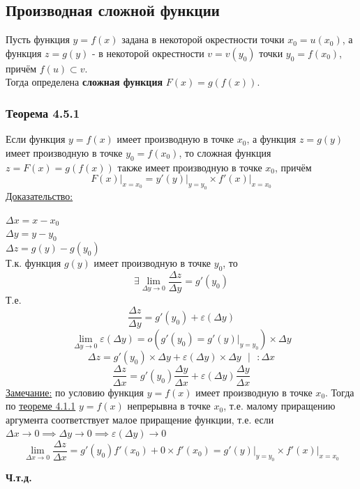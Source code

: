 \documentclass[12pt]{article}
\begin{document}
    \subsection{Производная сложной функции}\noindent
    Пусть функция $y = f(x)$ задана в некоторой окрестности точки $x_0 = u(x_0)$, а функция $z = g(y)$ - в некоторой окрестности $v = v(y_0)$ точки $y_0 = f(x_0)$, причём $f(u) \subset v$.\\
    Тогда определена \textbf{сложная функция} $F(x) = g(f(x))$.
    \subsubsection*{Теорема 4.5.1}\label{th:4.5.1}
    Если функция $y=f(x)$ имеет производную в точке $x_0$, а функция $z = g(y)$ имеет производную в точке $y_0 = f(x_0)$, то сложная функция $z = F(x) = g(f(x))$ также имеет производную в точке $x_0$, причём
    \[ F(x)\Big|_{x = x_0} = y'(y)\Big|_{y = y_0} \times f'(x)\Big|_{x = x_0} \]
    \underline{Доказательство:}
    \begin{adjustwidth}{1.5em}{1.5em}
        $\Delta x = x-x_0$\\
        $\Delta y = y-y_0$\\
        $\Delta z = g(y) - g(y_0)$\\
        Т.к. функция $g(y)$ имеет производную в точке $y_0$, то
        \[ \exists \lim_{\Delta y \to 0} \frac{\Delta z}{\Delta y} = g'(y_0) \]
        Т.е.
        \[ \frac{\Delta z}{\Delta y} = g'(y_0) + \varepsilon(\Delta y) \]
        \[ \lim_{\Delta y \to 0} \varepsilon(\Delta y) = o\left(g'(y_0) = g'(y)\Big|_{y = y_0}\right) \times \Delta y \]
        \[ \Delta z = g'(y_0) \times \Delta y + \varepsilon(\Delta y) \times \Delta y \text{ } \big| \text{ } : \Delta x \]
        \[ \frac{\Delta z}{\Delta x} = g'(y_0) \frac{\Delta y}{\Delta x} + \varepsilon(\Delta y)\frac{\Delta y}{\Delta x} \]
        \underline{Замечание:} по условию функция $y = f(x)$ имеет производную в точке $x_0$. Тогда по \hyperref[th:4.1.1]{теореме 4.1.1} $y = f(x)$ непрерывна в точке $x_0$, т.е. малому приращению аргумента соответствует малое приращение функции, т.е. если $\Delta x \to 0 \implies \Delta y \to 0 \implies \varepsilon(\Delta y) \to 0$
        \[ \lim_{\Delta x \to 0}\frac{\Delta z}{\Delta x} = g'(y_0)f'(x_0) + 0 \times f'(x_0) = g'(y)\Big|_{y = y_0} \times f'(x)\Big|_{x = x_0} \]
        \begin{center}
            \textbf{Ч.т.д.}
        \end{center}
    \end{adjustwidth}
\end{document}
